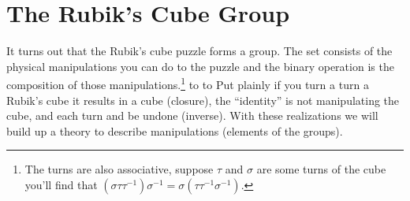 \documentclass{article}
\begin{document}
\section{The Rubik's Cube Group}
It turns out that the Rubik's cube puzzle forms a group. The set consists of the physical manipulations you can do to the puzzle and the binary operation is the composition of those manipulations.\footnote{The turns are also associative, suppose $\tau$ and $\sigma$ are some turns of the cube you'll find that $(\sigma\tau\tau^{-1})\sigma^{-1}=\sigma(\tau\tau^{-1}\sigma^{-1})$.}
to to 
Put plainly if you turn a turn a Rubik's cube it results in a cube (closure), the ``identity'' is not manipulating the cube, and each turn and be undone (inverse). With these realizations we will build up a theory to describe manipulations (elements of the groups).
\end{document}
